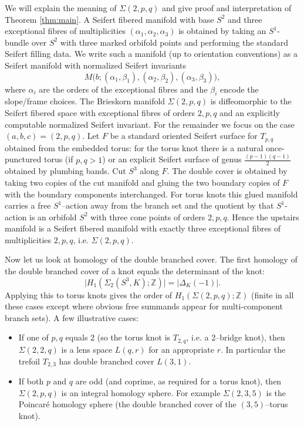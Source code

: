 \documentclass[table]{amsart}
\newcommand{\Z}{\mathbb{Z}}
\numberwithin{equation}{section}
\begin{document}
We will explain the meaning of \(\Sigma(2,p,q)\) and give proof and interpretation of Theorem \ref{thm:main}. A Seifert fibered manifold with base \(S^2\) and three exceptional fibres of multiplicities \((\alpha_1,\alpha_2,\alpha_3)\) is obtained by taking an \(S^1\)-bundle over \(S^2\) with three marked orbifold points and performing the standard Seifert filling data. We write such a manifold (up to orientation conventions) as a Seifert manifold with normalized Seifert invariants
\[
M\big(b;(\alpha_1,\beta_1),(\alpha_2,\beta_2),(\alpha_3,\beta_3)\big),
\]
where \(\alpha_i\) are the orders of the exceptional fibres and the \(\beta_i\) encode the slope/frame choices. The Brieskorn manifold \(\Sigma(2,p,q)\) is diffeomorphic to the Seifert fibered space with exceptional fibres of orders \(2,p,q\) and an explicitly computable normalized Seifert invariant. For the remainder we focus on the case \((a,b,c)=(2,p,q)\). Let \(F\) be a standard oriented Seifert surface for \(T_{p,q}\) obtained from the embedded torus: for the torus knot there is a natural once-punctured torus (if \(p,q>1\)) or an explicit Seifert surface of genus \(\frac{(p-1)(q-1)}{2}\) obtained by plumbing bands. Cut \(S^3\) along \(F\). The double cover is obtained by taking two copies of the cut manifold and gluing the two boundary copies of \(F\) with the boundary components interchanged. For torus knots this glued manifold carries a free \(S^1\)–action away from the branch set and the quotient by that \(S^1\)-action is an orbifold \(S^2\) with three cone points of orders \(2,p,q\). Hence the upstairs manifold is a Seifert fibered manifold with exactly three exceptional fibres of multiplicities \(2,p,q\), i.e. \(\Sigma(2,p,q)\). 
\par Now let us look at homology of the double branched cover. 
The first homology of the double branched cover of a knot equals the determinant of the knot:
\[
\big|H_1(\Sigma_2(S^3,K);\Z)\big| = |\Delta_K(-1)|.
\]
Applying this to torus knots gives the order of \(H_1(\Sigma(2,p,q);\Z)\) (finite in all these cases except where obvious free summands appear for multi-component branch sets). A few illustrative cases:
\begin{itemize}
  \item If one of \(p,q\) equals \(2\) (so the torus knot is \(T_{2,q}\), i.e. a 2--bridge knot), then \(\Sigma(2,2,q)\) is a lens space \(L(q,r)\) for an appropriate \(r\). In particular the trefoil \(T_{2,3}\) has double branched cover \(L(3,1)\).
  \item If both \(p\) and \(q\) are odd (and coprime, as required for a torus knot), then \(\Sigma(2,p,q)\) is an integral homology sphere. For example \(\Sigma(2,3,5)\) is the Poincaré homology sphere (the double branched cover of the \((3,5)\)--torus knot).
\end{itemize}
\end{document}
